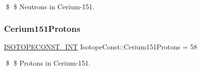 \$ \$ Neutrons in Cerium-\/151. \mbox{\label{group___isotope_const-_cerium-_ce151_gafa0fe31700263b65b46b717a9552dbb7}} 
\subsubsection{\texorpdfstring{Cerium151\+Protons}{Cerium151Protons}}
{\footnotesize\ttfamily \mbox{\hyperlink{group___isotope_const-_macros_ga5f18360b3e99483a35c32d789e62621c}{I\+S\+O\+T\+O\+P\+E\+C\+O\+N\+S\+T\+\_\+\+I\+NT}} Isotope\+Const\+::\+Cerium151\+Protons = 58}

\$ \$ Protons in Cerium-\/151. 